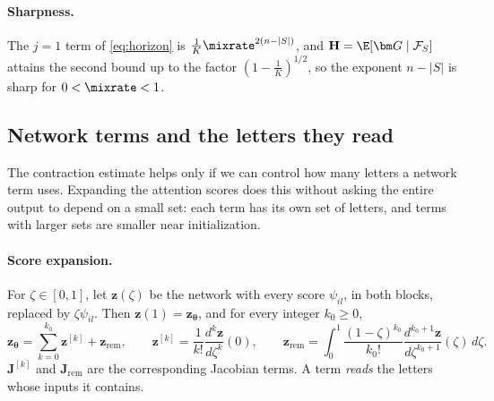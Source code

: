 \paragraph{Sharpness.}\label{rem:tight} The $j=1$ term of \cref{eq:horizon} is $\frac{1}{K}\mixrate^{2(n-|S|)}$, and $\mathbf H=\E[\bm G\mid\mathcal F_S]$ attains the second bound up to the
factor $(1-\frac{1}{K})^{1/2}$, so the exponent $n-|S|$ is sharp for $0<\mixrate<1$.

\subsection{Network terms and the letters they read}
\label{app:model-spectrum}

The contraction estimate helps only if we can control how many letters a network term uses. Expanding the attention scores does
this without asking the entire output to depend on a small set: each term has its own set of letters, and terms with larger sets
are smaller near initialization.

\paragraph{Score expansion.} For $\zeta\in[0,1]$, let $\bm z(\zeta)$ be the network with every score $\psi_{il}$, in both blocks, replaced by
$\zeta\psi_{il}$. Then $\bm z(1)=\bm z_{\bm\theta}$, and for every integer $k_0\ge0$,
\begin{equation}
 \bm z_{\bm\theta}=\sum_{k=0}^{k_0}\bm z^{[k]}+\bm z_{\mathrm{rem}},\qquad
 \bm z^{[k]}=\frac{1}{k!}\frac{d^k\bm z}{d\zeta^k}(0),\qquad
 \bm z_{\mathrm{rem}}=\int_0^1\frac{(1-\zeta)^{k_0}}{k_0!}\frac{d^{k_0+1}\bm z}{d\zeta^{k_0+1}}(\zeta)\,d\zeta .
 \label{eq:score-split}
\end{equation}
$\mathbf J^{[k]}$ and $\mathbf J_{\mathrm{rem}}$ are the corresponding Jacobian terms. A term \emph{reads} the letters whose inputs it contains.

